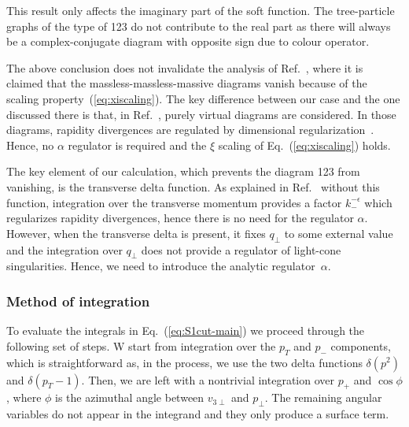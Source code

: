 \documentclass[a4paper,11pt]{article}
\numberwithin{equation}{section}
\begin{document}
This result only affects the imaginary part of the soft function. The
tree-particle graphs of the type of 123 do not contribute to the real part 
as there will always be a complex-conjugate diagram with opposite
sign due to colour operator.

The above conclusion does not invalidate the analysis of
Ref.~\cite{Aybat:2006wq}, where it is claimed that the massless-massless-massive
diagrams vanish because of the scaling property~(\ref{eq:xiscaling}). The key
difference between our case and the one discussed there is that, in
Ref.~\cite{Aybat:2006wq}, purely virtual diagrams are considered. In those
diagrams, rapidity divergences are regulated by dimensional
regularization~\cite{Becher:2011dz}.  Hence, no $\alpha$ regulator is required
and the $\xi$ scaling of Eq.~(\ref{eq:xiscaling}) holds.

The key element of our calculation, which prevents the diagram 123 from
vanishing, is the transverse delta function. As explained in
Ref.~\cite{Becher:2011dz} without this function, integration over the
transverse momentum provides a factor $k_-^{-\epsilon}$ which regularizes
rapidity divergences, hence there is no need for the regulator $\alpha$. 
%
However, when the transverse delta is present, it fixes $q_\perp$ to some
external value and the integration over $q_\perp$ does not provide a regulator
of light-cone singularities. Hence, we need to introduce the analytic
regulator~$\alpha$.

\subsubsection{Method of integration}

To evaluate the integrals in Eq.~(\ref{eq:S1cut-main}) we proceed through the
following set of steps. W start from integration over the $p_T$ and $p_-$
components, which is straightforward as, in the process, we use the two delta
functions $\delta(p^2)$ and $\delta(p_T-1)$. Then, we are left with a nontrivial
integration over $p_+$ and  $\cos \phi$ , where $\phi$ is the azimuthal angle
between $v_{3\perp}$ and $p_\perp$. The remaining angular variables do not
appear in the integrand and they only produce a surface term.
\end{document}
